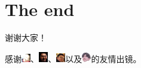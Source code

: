 \documentclass{beamer}
\begin{document}
	\section{The end}
	\begin{frame}{}
		\begin{center}
			{\Huge 谢谢大家！}
			
			\vspace{5 ex}
			
			感谢\includegraphics[width=0.4cm]{o_ji.jpg}、\includegraphics[width=0.4cm]{o_mao.png}、\includegraphics[width=0.4cm]{o_xzz.jpg}以及\includegraphics[width=0.4cm]{o_cxk.png}的友情出镜。
		\end{center}
		
		
	\end{frame}
\end{document}
